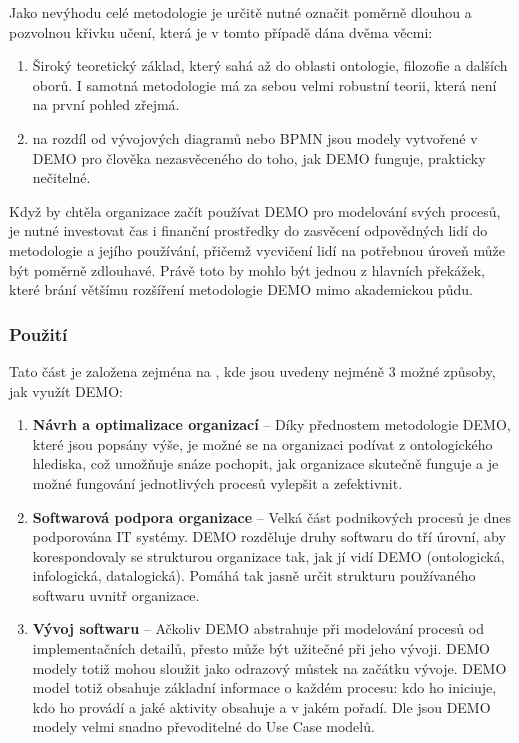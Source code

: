 Jako nevýhodu celé metodologie je určitě nutné označit poměrně dlouhou a pozvolnou křivku učení, která je v tomto případě dána dvěma věcmi:

\begin{enumerate}
\item Široký teoretický základ, který sahá až do oblasti ontologie, filozofie a dalších oborů. I samotná metodologie má za sebou velmi robustní teorii, která není na první pohled zřejmá.
\item na rozdíl od vývojových diagramů nebo BPMN jsou modely vytvořené v DEMO pro člověka nezasvěceného do toho, jak DEMO funguje, prakticky nečitelné.
\end{enumerate}

Když by chtěla organizace začít používat DEMO pro modelování svých procesů, je nutné investovat čas i finanční prostředky do zasvěcení odpovědných lidí do metodologie a jejího používání, přičemž vycvičení lidí na potřebnou úroveň může být poměrně zdlouhavé. Právě toto by mohlo být jednou z hlavních překážek, které brání většímu rozšíření metodologie DEMO mimo akademickou půdu.

\subsubsection{Použití}
Tato část je založena zejména na \cite{Vejrazkova2012}, kde jsou uvedeny nejméně 3 možné způsoby, jak využít DEMO:

\begin{enumerate}
\item \textbf{Návrh a optimalizace organizací} – Díky přednostem metodologie DEMO, které jsou popsány výše, je možné se na organizaci podívat z ontologického hlediska, což umožňuje snáze pochopit, jak organizace skutečně funguje a je možné fungování jednotlivých procesů vylepšit a zefektivnit.
\item \textbf{Softwarová podpora organizace} – Velká část podnikových procesů je dnes podporována IT systémy. DEMO rozděluje druhy softwaru do tří úrovní, aby korespondovaly se strukturou organizace tak, jak jí vidí DEMO (ontologická, infologická, datalogická). Pomáhá tak jasně určit strukturu používaného softwaru uvnitř organizace. %
\item \textbf{Vývoj softwaru} – Ačkoliv DEMO abstrahuje při modelování procesů od implementačních detailů, přesto může být užitečné při jeho vývoji. DEMO modely totiž mohou sloužit jako odrazový můstek na začátku vývoje. DEMO model totiž obsahuje základní informace o každém procesu: kdo ho iniciuje, kdo ho provádí a jaké aktivity obsahuje a v jakém pořadí. Dle \cite{Shishkov2005} jsou DEMO modely velmi snadno převoditelné do Use Case modelů.
\end{enumerate}



